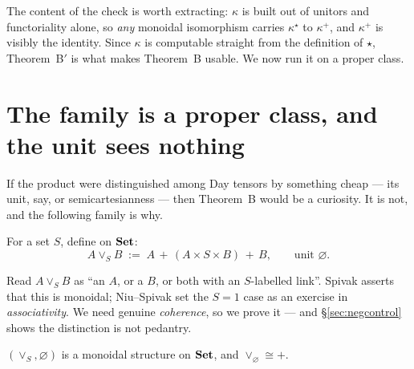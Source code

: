 The content of the check is worth extracting: $\kappa$ is built out of unitors
and functoriality alone, so \emph{any} monoidal isomorphism carries
$\kappa^\star$ to $\kappa^{+}$, and $\kappa^{+}$ is visibly the identity. Since
$\kappa$ is computable straight from the definition of $\star$, Theorem~B$'$ is
what makes Theorem~B usable. We now run it on a proper class.

\section{The family is a proper class, and the unit sees nothing}
\label{sec:properclass}

If the product were distinguished among Day tensors by something cheap --- its
unit, say, or semicartesianness --- then Theorem~B would be a curiosity. It is
not, and the following family is why.

\begin{Definition}[$\vee_S$]\label{def:veeS}
For a set $S$, define on $\mathbf{Set}$:
\[
   A\vee_S B \;:=\; A \,+\, (A\times S\times B) \,+\, B,\qquad
   \text{unit }\varnothing .
\]
\end{Definition}

Read $A\vee_S B$ as ``an $A$, or a $B$, or both with an $S$-labelled link''.
Spivak asserts that this is monoidal; Niu--Spivak set the $S=1$ case as an
exercise in \emph{associativity}. We need genuine \emph{coherence}, so we prove
it --- and §\ref{sec:negcontrol} shows the distinction is not pedantry.

\begin{Proposition}\label{prop:veecoh}
$(\vee_S,\varnothing)$ is a monoidal structure on $\mathbf{Set}$, and
$\vee_{\varnothing}\cong +$.
\end{Proposition}

